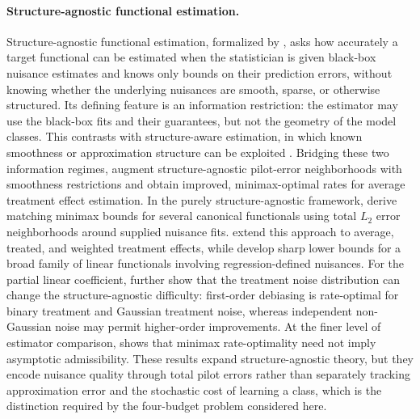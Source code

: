 \documentclass[11pt]{article}
\begin{document}
\paragraph{Structure-agnostic functional estimation.}
Structure-agnostic functional estimation, formalized by
\citet{balakrishnan2026fundamental}, asks how accurately a target functional
can be estimated when the statistician is given black-box nuisance estimates
and knows only bounds on their prediction errors, without knowing whether the
underlying nuisances are smooth, sparse, or otherwise structured. Its defining
feature is an information restriction: the estimator may use the black-box
fits and their guarantees, but not the geometry of the model classes. This
contrasts with structure-aware estimation, in which known smoothness or
approximation structure can be exploited
\citep{robins2008higher,robins2017minimax,liu2021adaptive}. Bridging these two
information regimes, \citet{bonvini2024doubly} augment structure-agnostic
pilot-error neighborhoods with smoothness restrictions and obtain improved,
minimax-optimal rates for average treatment effect estimation. In the purely
structure-agnostic framework, \citet{balakrishnan2026fundamental} derive
matching minimax bounds for several canonical functionals using total $L_2$
error neighborhoods around supplied nuisance fits. \citet{jin2025structure}
extend this approach to average, treated, and weighted treatment effects,
while \citet{jin2026sharp} develop sharp lower bounds for a broad family of
linear functionals involving regression-defined nuisances. For the partial
linear coefficient, \citet{jin2025hard} further show that the treatment noise
distribution can change the structure-agnostic difficulty: first-order
debiasing is rate-optimal for binary treatment and Gaussian treatment noise,
whereas independent non-Gaussian noise may permit higher-order improvements.
At the finer level of estimator comparison, \citet{liu2026inadmissibility}
shows that minimax rate-optimality need not imply asymptotic admissibility. These results expand
structure-agnostic theory, but they encode nuisance quality through total
pilot errors rather than separately tracking approximation error and the
stochastic cost of learning a class, which is the distinction required by the
four-budget problem considered here.
\end{document}
